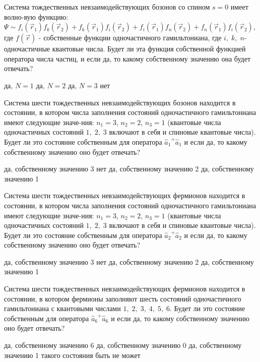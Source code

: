 \documentclass[11pt,a4paper]{exam}
\begin{document}
\begin{questions}
\question Система тождественных невзаимодействующих бозонов со спином $s = 0$ имеет волно-вую функцию: $\Psi  \sim {f_i}({\vec r_1}){f_k}({\vec r_2}) + {f_k}({\vec r_1}){f_i}({\vec r_2}) + {f_i}({\vec r_1}){f_n}({\vec r_2}) + {f_n}({\vec r_1}){f_i}({\vec r_2})$, где $f(\vec r)$ - собственные функции одночастичного гамильтониана, где $i,\;k,\;n$- одночастичные квантовые числа. Будет ли эта функция собственной функцией оператора числа частиц, и если да, то какому собственному значению она будет отвечать?
\begin{choices}
\choice да, $N = 1$    
\choice да, $N = 2$    
\choice да, $N = 3$    
\choice нет
\end{choices}

\question Система шести тождественных невзаимодействующих бозонов находится в состоянии, в котором числа заполнения состояний одночастичного гамильтониана имеют следующие значе-ния: ${n_1} = 3$, ${n_2} = 2$, ${n_3} = 1$ (квантовые числа одночастичных состояний $1,\;2,\;3$ включают в себя и спиновые квантовые числа). Будет ли это состояние собственным для оператора ${\hat a_1}^ + {\hat a_1}$ и если да, то какому собственному значению оно будет отвечать?
\begin{choices}
\choice да, собственному значению 3
\choice нет
\choice да, собственному значению 2
\choice да, собственному значению 1
\end{choices}

\question Система шести тождественных невзаимодействующих фермионов находится в состоянии, в котором числа заполнения состояний одночастичного гамильтониана имеют следующие значе-ния: ${n_1} = 3$, ${n_2} = 2$, ${n_3} = 1$ (квантовые числа одночастичных состояний $1,\;2,\;3$ включают в себя и спиновые квантовые числа). Будет ли это состояние собственным для оператора ${\hat a_2}^ + {\hat a_2}$ и если да, то какому собственному значению оно будет отвечать?
\begin{choices}
\choice да, собственному значению 3
\choice нет
\choice да, собственному значению 2
\choice да, собственному значению 1
\end{choices}

\question Система шести тождественных невзаимодействующих фермионов находится в состоянии, в котором фермионы заполняют шесть состояний одночастичного гамильтониана с квантовыми числами $1,\;2,\;3,\;4,\;5,\;6$. Будет ли это состояние собственным для оператора ${\hat a_6}^ + {\hat a_6}$ и если да, то какому собственному значению оно будет отвечать?
\begin{choices}
\choice да, собственному значению 6
\choice да, собственному значению 0
\choice да, собственному значению 1
\choice такого состояния быть не может
\end{choices}


\end{questions}
\end{document}
